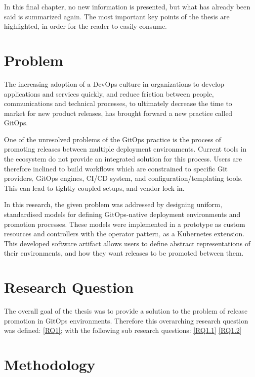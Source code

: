 In this final chapter,
no new information is presented,
but what has already been said is summarized again.
The most important key points of the thesis are highlighted,
in order for the reader to easily consume.

\section*{Problem}

The increasing adoption of a DevOps culture in organizations to develop applications and services quickly,
and reduce friction between people, communications and technical processes,
to ultimately decrease the time to market for new product releases,
has brought forward a new practice called GitOps.

One of the unresolved problems of the GitOps practice is
the process of promoting releases between multiple deployment environments.
Current tools in the ecosystem do not provide an integrated solution for this process.
Users are therefore inclined to build workflows which are constrained to specific
Git providers, GitOps engines,
CI/CD system, and configuration/templating tools. This can lead to tightly coupled setups,
and vendor lock-in.

In this research,
the given problem was addressed by designing uniform, standardised models for
defining GitOps-native deployment environments and promotion processes.
These models were implemented in a prototype as custom resources and controllers with the
operator pattern, as a Kubernetes extension.
This developed software artifact allows users to define abstract representations
of their environments, and how they want releases to be promoted between them.

\section*{Research Question}

The overall goal of the thesis was to provide a solution to the problem of
release promotion in GitOps environments.
Therefore this overarching research question was defined:
\ref{RQ1};
with the following sub research questions:
\ref{RQ1.1}
\ref{RQ1.2}

\section*{Methodology}

